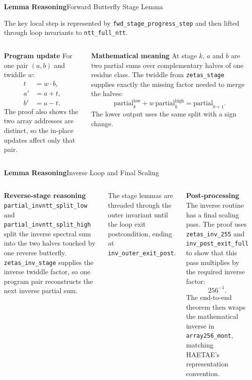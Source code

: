 \documentclass[10pt,aspectratio=1610,compress,dvipsnames]{beamer}
\newcommand{\ec}[1]{\texttt{#1}}
\begin{document}
\begin{frame}{\bfseries Lemma Reasoning}{Forward Butterfly Stage Lemma}
\begin{center}
\small
The key local step is represented by \ec{fwd\_stage\_progress\_step} and then
lifted through loop invariants to \ec{ntt\_full\_ntt}.
\end{center}

\vspace{4pt}
\begin{columns}[T]
\textbf{Program update}
\small
For one pair $(a,b)$ and twiddle $w$:
\[
\begin{aligned}
  t &= w\cdot b,\\
  a' &= a+t,\\
  b' &= a-t.
\end{aligned}
\]
The proof also shows the two array addresses are distinct, so the in-place
updates affect only that pair.

\textbf{Mathematical meaning}
\small
At stage $k$, $a$ and $b$ are two partial sums over complementary halves of
one residue class.  The twiddle from \ec{zetas\_stage} supplies exactly the
missing factor needed to merge the halves:
\[
  \text{partial}_k^{\mathrm{low}}
  + w\,\text{partial}_k^{\mathrm{high}}
  =
  \text{partial}_{k+1}.
\]
The lower output uses the same split with a sign change.
\end{columns}
\end{frame}

\begin{frame}{\bfseries Lemma Reasoning}{Inverse Loop and Final Scaling}
\begin{columns}[T]
\textbf{Reverse-stage reasoning}
\small
\ec{partial\_invntt\_split\_low} and
\ec{partial\_invntt\_split\_high} split the inverse spectral sum into the two
halves touched by one reverse butterfly.  \ec{zetas\_inv\_stage} supplies the
inverse twiddle factor, so one program pair reconstructs the next inverse
partial sum.

\vspace{4pt}
The stage lemmas are threaded through the outer invariant until the loop exit
postcondition, ending at \ec{inv\_outer\_exit\_post}.

\textbf{Post-processing}
\small
The inverse routine has a final scaling pass.  The proof uses
\ec{zetas\_inv\_255} and \ec{inv\_post\_exit\_full} to show that this pass
multiplies by the required inverse factor:
\[
  256^{-1}.
\]
The end-to-end theorem then wraps the mathematical inverse in
\ec{array256\_mont}, matching HAETAE's representation convention.
\end{columns}
\end{frame}
\end{document}
